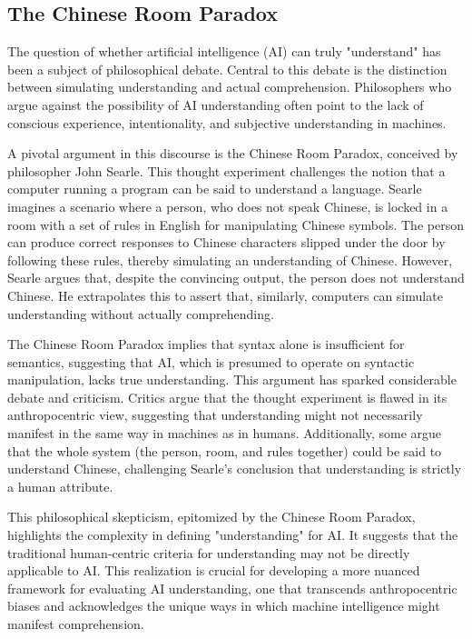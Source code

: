 \documentclass{article}
\begin{document}
\subsection{The Chinese Room Paradox}
\label{subsec:intro-chinese}
The question of whether artificial intelligence (AI) can truly "understand" has been a subject of philosophical debate. 
Central to this debate is the distinction between simulating understanding and actual comprehension. 
Philosophers who argue against the possibility of AI understanding often point to the lack of conscious experience, intentionality, and subjective understanding in machines.\par

A pivotal argument in this discourse is the Chinese Room Paradox, conceived by philosopher John Searle\cite{searle1980minds}. 
This thought experiment challenges the notion that a computer running a program can be said to understand a language. 
Searle imagines a scenario where a person, who does not speak Chinese, is locked in a room with a set of rules in English for manipulating Chinese symbols. 
The person can produce correct responses to Chinese characters slipped under the door by following these rules, thereby simulating an understanding of Chinese. 
However, Searle argues that, despite the convincing output, the person does not understand Chinese. 
He extrapolates this to assert that, similarly, computers can simulate understanding without actually comprehending.\par

The Chinese Room Paradox implies that syntax alone is insufficient for semantics, suggesting that AI, which is presumed to operate on syntactic manipulation, lacks true understanding. 
This argument has sparked considerable debate and criticism. 
Critics argue that the thought experiment is flawed in its anthropocentric view, suggesting that understanding might not necessarily manifest in the same way in machines as in humans. 
Additionally, some argue that the whole system (the person, room, and rules together) could be said to understand Chinese, challenging Searle's conclusion that understanding is strictly a human attribute.\par 

This philosophical skepticism, epitomized by the Chinese Room Paradox, highlights the complexity in defining "understanding" for AI. 
It suggests that the traditional human-centric criteria for understanding may not be directly applicable to AI. 
This realization is crucial for developing a more nuanced framework for evaluating AI understanding, one that transcends anthropocentric biases and acknowledges the unique ways in which machine intelligence might manifest comprehension.
\end{document}
